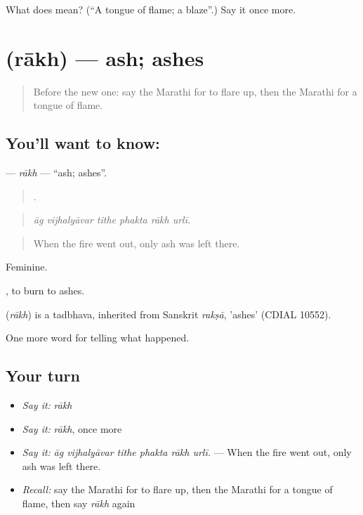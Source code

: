 \begin{tcolorbox}[breakable,colback=teal!4,colframe=teal!35!black,title={Before you move on}]
What does  mean? (\textquotedblleft{}A tongue of flame; a blaze\textquotedblright{}.) Say it once more.
\end{tcolorbox}
\section[\texorpdfstring{\mr{राख} (rākh)}{राख (rākh)}]{ (rākh) — ash; ashes}

\label{lesson:MR-C292-rakh}



\begin{quote}
Before the new one: say the Marathi for to flare up, then the Marathi for a tongue of flame.
\end{quote}

\subsection*{You'll want to know: }
\textbf{} — \emph{rākh} — \textquotedblleft{}ash; ashes\textquotedblright{}.

\begin{quote}
     .
\end{quote}

\begin{quote}
\emph{āg vijhalyāvar tithe phakta rākh urlī.}
\end{quote}

\begin{quote}
When the fire went out, only ash was left there.
\end{quote}

Feminine.

 , to burn to ashes.

\begin{cousinweb}
\textbf{} (\emph{rākh}) is a tadbhava, inherited from Sanskrit \emph{rakṣā}, 'ashes' (CDIAL 10552).
\end{cousinweb}

\begin{grammarlens}[title={What you've built}]
One more word for telling what happened.
\end{grammarlens}

\subsection*{Your turn}
\begin{itemize}
\raggedright
  \item \emph{Say it:} \emph{rākh}
  \item \emph{Say it:} \emph{rākh}, once more
  \item \emph{Say it:} \emph{āg vijhalyāvar tithe phakta rākh urlī.} — When the fire went out, only ash was left there.
  \item \emph{Recall:} say the Marathi for to flare up, then the Marathi for a tongue of flame, then say \emph{rākh} again
\end{itemize}

